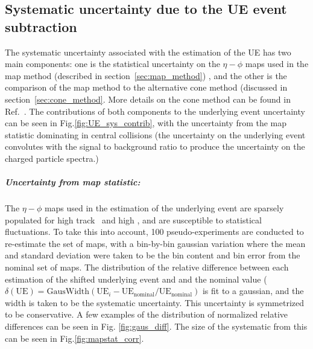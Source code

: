 \subsection{Systematic uncertainty due to the UE event subtraction}
The systematic uncertainty associated with the estimation of the UE has two main components: one is the statistical uncertainty on the $\eta-\phi$ maps used in the map method (described in section~\ref{sec:map_method}) , and the other is the comparison of the map method to the alternative cone method (discussed in section~\ref{sec:cone_method}. More details on the cone method can be found in Ref.~\cite{PhysRevC.98.024908}. The contributions of both components to the underlying event uncertainty can be seen in Fig.\ref{fig:UE_sys_contrib}, with the uncertainty from the map statistic dominating in central collisions (the uncertainty on the underlying event convolutes with the signal to background ratio to produce the uncertainty on the charged particle spectra.)

\subparagraph{Uncertainty from map statistic:} 
The $\eta-\phi$ maps used in the estimation of the underlying event are sparsely populated for high track \pt\ and high \ptjet, and are susceptible to statistical fluctuations. To take this into account, 100 pseudo-experiments are conducted to re-estimate the set of maps, with a bin-by-bin gaussian variation where the mean and standard deviation were taken to be the bin content and bin error from the nominal set of maps. The distribution of the relative difference between each estimation of the shifted underlying event and and the nominal value ( $\delta (\mathrm{UE}) = \mathrm{GausWidth}(\mathrm{UE}_i - \mathrm{UE}_{\mathrm{nominal}} / \mathrm{UE}_{\mathrm{nominal}})$ is fit to a gaussian, and the width is taken to be the systematic uncertainty. This uncertainty is symmetrized to be conservative.  A few examples of the distribution of normalized relative differences can be seen in Fig. \ref{fig:gaus_diff}. The size of the systematic from this can be seen in Fig.\ref{fig:mapstat_corr}.

